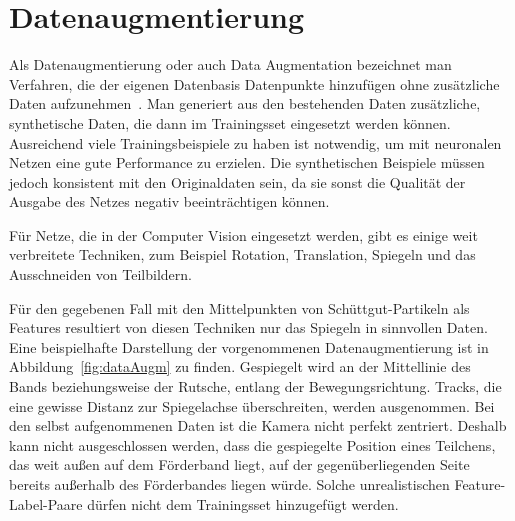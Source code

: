 


\section{Datenaugmentierung}




Als Datenaugmentierung oder auch Data Augmentation bezeichnet man Verfahren, die der eigenen Datenbasis Datenpunkte hinzufügen ohne zusätzliche Daten aufzunehmen~\cite[Kapitel 7.4]{Goodfellow-et-al-2016}.
Man generiert aus den bestehenden Daten zusätzliche, synthetische Daten, die dann im Trainingsset eingesetzt werden können.
Ausreichend viele Trainingsbeispiele zu haben ist notwendig, um mit neuronalen Netzen eine gute Performance zu erzielen.
Die synthetischen Beispiele müssen jedoch konsistent mit den Originaldaten sein, da sie sonst die Qualität der Ausgabe des Netzes negativ beeinträchtigen können.

Für Netze, die in der Computer Vision eingesetzt werden, gibt es einige weit verbreitete Techniken,
zum Beispiel Rotation, Translation, Spiegeln und das Ausschneiden von Teilbildern.

Für den gegebenen Fall mit den Mittelpunkten von Schüttgut-Partikeln als Features resultiert von diesen Techniken nur das Spiegeln in sinnvollen Daten.
Eine beispielhafte Darstellung der vorgenommenen Datenaugmentierung ist in Abbildung~\ref{fig:dataAugm} zu finden.
Gespiegelt wird an der Mittellinie des Bands beziehungsweise der Rutsche, entlang der Bewegungsrichtung.
Tracks, die eine gewisse Distanz zur Spiegelachse überschreiten, werden ausgenommen.
Bei den selbst aufgenommenen Daten ist die Kamera nicht perfekt zentriert. 
Deshalb kann nicht ausgeschlossen werden, dass die gespiegelte Position eines Teilchens, 
das weit außen auf dem Förderband liegt, auf der gegenüberliegenden Seite bereits außerhalb des Förderbandes liegen würde.
Solche unrealistischen Feature-Label-Paare dürfen nicht dem Trainingsset hinzugefügt werden.

